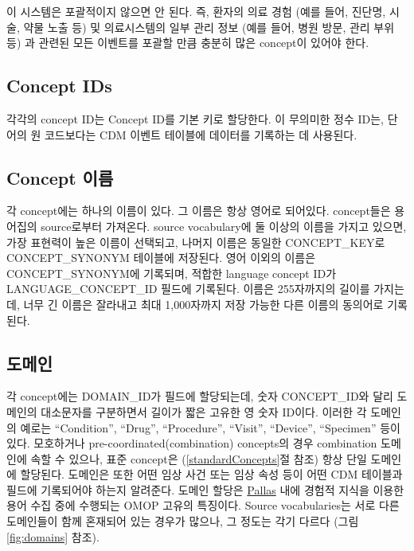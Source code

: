 \documentclass[11pt]{book}
\theoremstyle{definition}
\theoremstyle{definition}
\theoremstyle{definition}
\theoremstyle{remark}
\begin{document}
이 시스템은 포괄적이지 않으면 안 된다. 즉, 환자의 의료 경험 (예를 들어,
진단명, 시술, 약물 노출 등) 및 의료시스템의 일부 관리 정보 (예를 들어,
병원 방문, 관리 부위 등) 과 관련된 모든 이벤트를 포괄할 만큼 충분히 많은
concept이 있어야 한다.

\subsection{Concept IDs}\label{concept-ids}

각각의 concept ID는 Concept ID를 기본 키로 할당한다. 이 무의미한 정수
ID는, 단어의 원 코드보다는 CDM 이벤트 테이블에 데이터를 기록하는 데
사용된다.

\subsection{Concept 이름}\label{concept-}

각 concept에는 하나의 이름이 있다. 그 이름은 항상 영어로 되어있다.
concept들은 용어집의 source로부터 가져온다. source vocabulary에 둘
이상의 이름을 가지고 있으면, 가장 표현력이 높은 이름이 선택되고, 나머지
이름은 동일한 CONCEPT\_KEY로 CONCEPT\_SYNONYM 테이블에 저장된다. 영어
이외의 이름은 CONCEPT\_SYNONYM에 기록되며, 적합한 language concept ID가
LANGUAGE\_CONCEPT\_ID 필드에 기록된다. 이름은 255자까지의 길이를
가지는데, 너무 긴 이름은 잘라내고 최대 1,000자까지 저장 가능한 다른
이름의 동의어로 기록된다.

\subsection{도메인}\label{conceptDomains}

각 concept에는 DOMAIN\_ID가 필드에 할당되는데, 숫자 CONCEPT\_ID와 달리
도메인의 대소문자를 구분하면서 길이가 짧은 고유한 영 숫자 ID이다. 이러한
각 도메인의 예로는 ``Condition'', ``Drug'', ``Procedure'', ``Visit'',
``Device'', ``Specimen'' 등이 있다. 모호하거나
pre-coordinated(combination) concepts의 경우 combination 도메인에 속할
수 있으나, 표준 concept은 (\ref{standardConcepts}절 참조) 항상 단일
도메인에 할당된다. 도메인은 또한 어떤 임상 사건 또는 임상 속성 등이 어떤
CDM 테이블과 필드에 기록되어야 하는지 알려준다. 도메인 할당은
\href{https://github.com/ohDSI/vocabulary-v5.0}{Pallas} 내에 경험적
지식을 이용한 용어 수집 중에 수행되는 OMOP 고유의 특징이다. Source
vocabularies는 서로 다른 도메인들이 함께 혼재되어 있는 경우가 많으나, 그
정도는 각기 다르다 (그림\ref{fig:domains} 참조). 
\end{document}
